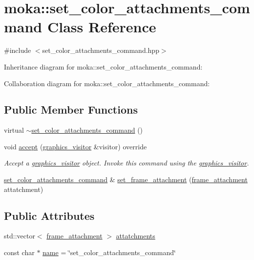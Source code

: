\hypertarget{classmoka_1_1set__color__attachments__command}{}\section{moka\+::set\+\_\+color\+\_\+attachments\+\_\+command Class Reference}
\label{classmoka_1_1set__color__attachments__command}


{\ttfamily \#include $<$set\+\_\+color\+\_\+attachments\+\_\+command.\+hpp$>$}



Inheritance diagram for moka\+::set\+\_\+color\+\_\+attachments\+\_\+command\+:


Collaboration diagram for moka\+::set\+\_\+color\+\_\+attachments\+\_\+command\+:
\subsection*{Public Member Functions}
\begin{DoxyCompactItemize}
\item 
virtual \mbox{\hyperlink{classmoka_1_1set__color__attachments__command_a416990ddd25c1dc9aadeef17a339f767}{$\sim$set\+\_\+color\+\_\+attachments\+\_\+command}} ()
\item 
void \mbox{\hyperlink{classmoka_1_1set__color__attachments__command_a54f81dc588ded92764ce28c37fa576c6}{accept}} (\mbox{\hyperlink{classmoka_1_1graphics__visitor}{graphics\+\_\+visitor}} \&visitor) override
\begin{DoxyCompactList}\small\item\em Accept a \mbox{\hyperlink{classmoka_1_1graphics__visitor}{graphics\+\_\+visitor}} object. Invoke this command using the \mbox{\hyperlink{classmoka_1_1graphics__visitor}{graphics\+\_\+visitor}}. \end{DoxyCompactList}\item 
\mbox{\hyperlink{classmoka_1_1set__color__attachments__command}{set\+\_\+color\+\_\+attachments\+\_\+command}} \& \mbox{\hyperlink{classmoka_1_1set__color__attachments__command_a21d82af8958888522394f5702c1dfbce}{set\+\_\+frame\+\_\+attachment}} (\mbox{\hyperlink{namespacemoka_a0a44ecbb877dec1107d9915dc95c58d1}{frame\+\_\+attachment}} attatchment)
\end{DoxyCompactItemize}
\subsection*{Public Attributes}
\begin{DoxyCompactItemize}
\item 
std\+::vector$<$ \mbox{\hyperlink{namespacemoka_a0a44ecbb877dec1107d9915dc95c58d1}{frame\+\_\+attachment}} $>$ \mbox{\hyperlink{classmoka_1_1set__color__attachments__command_a50bb71db24d2d08a8030ea623a98f149}{attatchments}}
\item 
const char $\ast$ \mbox{\hyperlink{classmoka_1_1set__color__attachments__command_a77905ca7babea5710cf12201b8549fd8}{name}} = \char`\"{}set\+\_\+color\+\_\+attachments\+\_\+command\char`\"{}
\end{DoxyCompactItemize}


